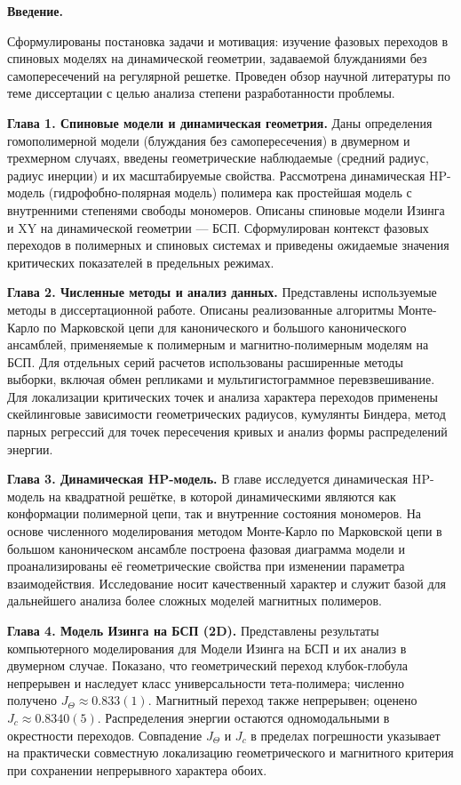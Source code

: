 \noindent\textbf{Введение.}

Сформулированы постановка задачи и мотивация: изучение фазовых переходов в спиновых моделях на динамической геометрии,  задаваемой блужданиями без самопересечений на регулярной решетке. 
Проведен обзор научной литературы по теме диссертации с целью анализа степени разработанности проблемы.

\medskip
\noindent\textbf{Глава 1. Спиновые модели и динамическая геометрия.}
Даны определения гомополимерной модели (блуждания без самопересечения) в двумерном и трехмерном случаях, введены геометрические наблюдаемые (средний радиус, радиус инерции) и их масштабируемые свойства. 
Рассмотрена динамическая HP-модель (гидрофобно-полярная модель) полимера как простейшая модель с внутренними степенями свободы мономеров.
Описаны спиновые модели Изинга и XY на динамической геометрии --- БСП. Сформулирован контекст фазовых переходов в полимерных и спиновых системах и  приведены ожидаемые значения критических показателей в предельных режимах.
 

\medskip
\noindent\textbf{Глава 2. Численные методы и анализ данных.}
Представлены используемые методы в диссертационной работе. 
Описаны  реализованные алгоритмы Монте-Карло по Марковской цепи для канонического и большого канонического ансамблей, применяемые к полимерным и магнитно-полимерным моделям на БСП. 
Для отдельных серий расчетов использованы расширенные методы выборки, включая обмен репликами и мультигистограммное перевзвешивание.
 Для локализации критических точек и анализа характера переходов применены скейлинговые зависимости геометрических радиусов, кумулянты Биндера, метод парных регрессий для точек пересечения кривых и анализ формы распределений энергии.
 

\medskip
\noindent\textbf{Глава 3. Динамическая HP-модель.}
В главе исследуется динамическая HP-модель на квадратной решётке, в которой динамическими являются как конформации полимерной цепи, так и внутренние состояния мономеров. 
На основе численного моделирования методом Монте-Карло по Марковской цепи в большом каноническом ансамбле построена фазовая диаграмма модели и проанализированы её геометрические свойства при изменении параметра взаимодействия. 
Исследование носит качественный характер и служит базой для дальнейшего анализа более сложных моделей магнитных полимеров.



\medskip
\noindent\textbf{Глава 4. Модель Изинга на БСП (2D).}
Представлены результаты компьютерного моделирования для Модели Изинга на БСП и их анализ в двумерном случае. 
Показано, что геометрический переход клубок-глобула непрерывен и наследует класс универсальности тета-полимера; численно получено $J_{\Theta}\approx 0.833(1)$. 
Магнитный переход также непрерывен; оценено $J_{c}\approx 0.8340(5)$. Распределения энергии  остаются одномодальными в окрестности переходов. Совпадение $J_{\Theta}$ и $J_{c}$ в пределах погрешности указывает на практически совместную локализацию геометрического и магнитного критерия при сохранении непрерывного характера обоих.
 

